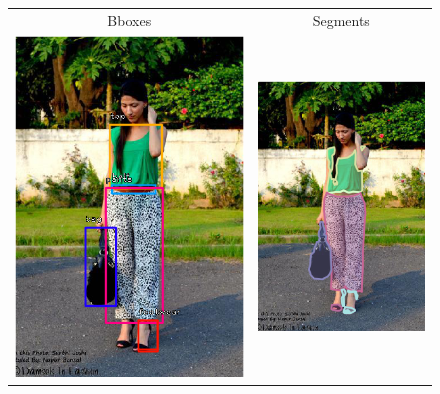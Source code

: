 \begin{figure}[H]
	\centering
	\setlength{\tabcolsep}{0.5pt}
	\setlength{\fboxsep}{0pt}%
	\setlength{\fboxrule}{0.1pt}%
	\renewcommand{\arraystretch}{0.6}
	\begin{tabular}{cc}
		Bboxes & Segments\\
		\includegraphics[width=.5\textwidth]{./figures/modanetfix/0892135_o} & 
		\includegraphics[width=.5\textwidth]{./figures/modanetfix/0892135_oc}\\
		

\end{tabular}
\end{figure}
